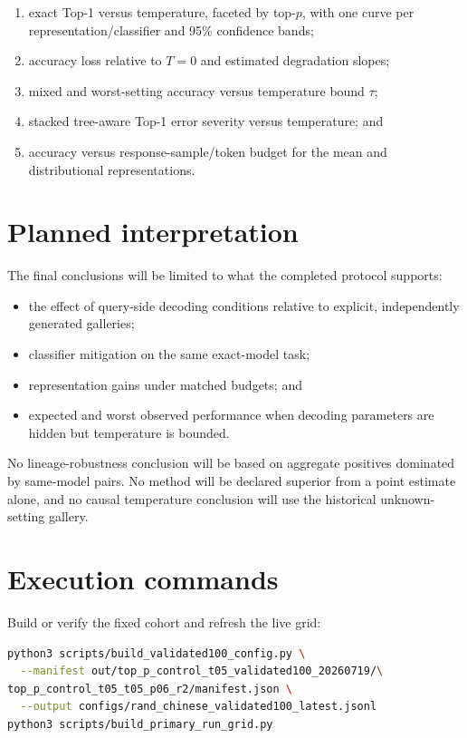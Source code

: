 \documentclass[11pt,a4paper]{article}
\begin{document}
\begin{enumerate}
  \item exact Top-1 versus temperature, faceted by top-$p$, with one curve per
        representation/classifier and 95\% confidence bands;
  \item accuracy loss relative to $T=0$ and estimated degradation slopes;
  \item mixed and worst-setting accuracy versus temperature bound $\tau$;
  \item stacked tree-aware Top-1 error severity versus temperature; and
  \item accuracy versus response-sample/token budget for the mean and
        distributional representations.
\end{enumerate}

\section{Planned interpretation}

The final conclusions will be limited to what the completed protocol supports:

\begin{itemize}
  \item the effect of query-side decoding conditions relative to explicit,
        independently generated galleries;
  \item classifier mitigation on the same exact-model task;
  \item representation gains under matched budgets; and
  \item expected and worst observed performance when decoding parameters are
        hidden but temperature is bounded.
\end{itemize}

No lineage-robustness conclusion will be based on aggregate positives dominated
by same-model pairs. No method will be declared superior from a point estimate
alone, and no causal temperature conclusion will use the historical
unknown-setting gallery.

\appendix

\section{Execution commands}

Build or verify the fixed cohort and refresh the live grid:

\begin{lstlisting}[language=bash]
python3 scripts/build_validated100_config.py \
  --manifest out/top_p_control_t05_validated100_20260719/\
top_p_control_t05_t05_p06_r2/manifest.json \
  --output configs/rand_chinese_validated100_latest.jsonl
python3 scripts/build_primary_run_grid.py
\end{lstlisting}
\end{document}
